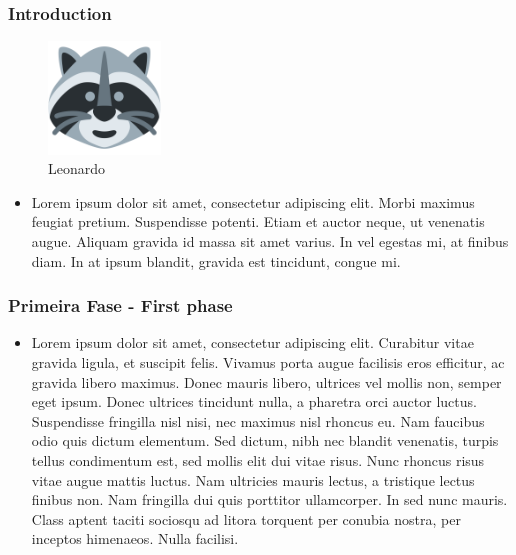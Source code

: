 \begin{frame}
    \frametitle{Introduction}
    \begin{figure}
        \centering
        \includegraphics[width=3cm]{./assets/leonardo.png}
        \caption{Leonardo}
    \end{figure}
    \begin{itemize} 
        \item Lorem ipsum dolor sit amet, consectetur adipiscing elit. Morbi
        maximus feugiat pretium. Suspendisse potenti. Etiam et auctor neque, ut
        venenatis augue. Aliquam gravida id massa sit amet varius. In vel
        egestas mi, at finibus diam. In at ipsum blandit, gravida est tincidunt,
        congue mi. 
    \end{itemize}
\end{frame}

\begin{frame}
    \frametitle{\checkmark \hspace{1mm} \textbf{Primeira Fase} - First phase}
    \begin{itemize}
        \item Lorem ipsum dolor sit amet, consectetur adipiscing elit. Curabitur
        vitae gravida ligula, et suscipit felis. Vivamus porta augue facilisis
        eros efficitur, ac gravida libero maximus. Donec mauris libero, ultrices
        vel mollis non, semper eget ipsum. Donec ultrices tincidunt nulla, a
        pharetra orci auctor luctus. Suspendisse fringilla nisl nisi, nec
        maximus nisl rhoncus eu. Nam faucibus odio quis dictum elementum. Sed
        dictum, nibh nec blandit venenatis, turpis tellus condimentum est, sed
        mollis elit dui vitae risus. Nunc rhoncus risus vitae augue mattis
        luctus. Nam ultricies mauris lectus, a tristique lectus finibus non. Nam
        fringilla dui quis porttitor ullamcorper. In sed nunc mauris. Class
        aptent taciti sociosqu ad litora torquent per conubia nostra, per
        inceptos himenaeos. Nulla facilisi. 
    \end{itemize}
\end{frame}